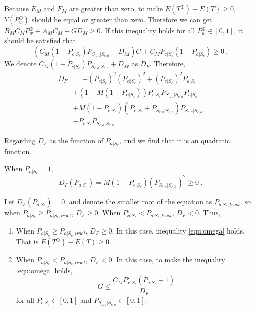 Because $E_{M}$ and $F_{M}$ are greater than zero, to make $E(T^{\oplus}) - E(T) \geq 0$, $Y(P_{w}^{\oplus})$ should be equal or greater than zero.
Therefore we can get $ B_{M}C_{M}P_{w}^{\oplus}+A_{M}C_{M}+GD_{M} \geq 0$.
If this inequality holds for all $P_{w}^{\oplus} \in [0,1]$, it should be satisfied that
\begin{equation}\label{equ:omega}
  (C_{M}(1-P_{e|S_{c}})P_{S_{\bar{c}, a}|S_{\bar{c},\bar{a}}}+D_{M})G+C_{M}P_{e|S_{c}}(1-P_{a|S_{c}}) \geq 0 \ .
\end{equation}
We denote $C_{M}(1-P_{e|S_{c}})P_{S_{\bar{c}, a}|S_{\bar{c},\bar{a}}}+D_{M}$ as $D_{F}$.
Therefore,
\begin{equation}
\begin{split}
D_{F} &=-(P_{e|S_{c}})^2(P_{a|S_{c}})^2+(P_{e|S_{c}})^2P_{a|S_{c}}  \\
&+(1-M(1-P_{e|S_{c}}))P_{e|S_{c}}P_{S_{\bar{c}, a}|S_{\bar{c},\bar{a}}}P_{a|S_{c}}\\
&+M(1-P_{e|S_{c}})(P_{e|S_{c}}+P_{S_{\bar{c}, a}|S_{\bar{c},\bar{a}}})P_{S_{\bar{c}, a}|S_{\bar{c},\bar{a}}}\\
&-P_{e|S_{c}}P_{S_{\bar{c}, a}|S_{\bar{c},\bar{a}}}
\end{split}\end{equation}

Regarding $D_{F}$ as the function of $P_{a|S_{c}}$,
and we find that it is an quadratic function.

When $P_{a|S_{c}} = 1$,
$$D_{F}(P_{a|S_{c}})=M(1-P_{e|S_{c}})(P_{S_{\bar{c}, a}|S_{\bar{c},\bar{a}}})^2 \geq 0 \ .$$

Let $D_{F}(P_{a|S_{c}}) = 0$,
 and denote the smaller root of the equation as $P_{a|S_{c},lroot}$.
  so when $P_{a|S_{c}} \geq P_{a|S_{c},lroot}$, $D_{F} \geq 0$.
   When $P_{a|S_{c}} < P_{a|S_{c},lroot}$, $D_{F} < 0$.
 Thus,
\begin{enumerate}
  \item
  When $P_{a|S_{c}} \geq P_{a|S_{c},lroot}$, $D_{F} \geq 0$.
  In this case, inequality \ref{equ:omega} holds. That is $E(T^{\oplus}) - E(T) \geq 0$.
  \item
  When $P_{a|S_{c}} < P_{a|S_{c},lroot}$, $D_{F} < 0$.
   In this case, to make the inequality \ref{equ:omega} holds,
   \begin{equation}\label{equ:ge}
     G \leq \frac{C_{M}P_{e|S_{c}}(P_{a|S_{c}}-1)}{D_{F}}
   \end{equation}
    for all $P_{e|S_{c}} \in [0,1]$ and $P_{S_{\bar{c}, a}|S_{\bar{c},\bar{a}}} \in [0,1]$.
\end{enumerate}

